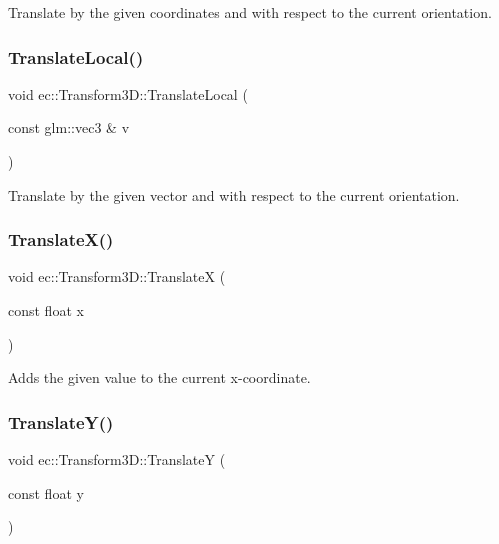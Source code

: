 Translate by the given coordinates and with respect to the current orientation. \mbox{\label{classec_1_1_transform3_d_a44ece37c7f56329840c2f92ae695e9a2}} 
\subsubsection{\texorpdfstring{Translate\+Local()}{TranslateLocal()}\hspace{0.1cm}{\footnotesize\ttfamily [2/2]}}
{\footnotesize\ttfamily void ec\+::\+Transform3\+D\+::\+Translate\+Local (\begin{DoxyParamCaption}\item[{const glm\+::vec3 \&}]{v }\end{DoxyParamCaption})}

Translate by the given vector and with respect to the current orientation. \mbox{\label{classec_1_1_transform3_d_a0c1e55c9edcd7cb53199fd05ba111099}} 
\subsubsection{\texorpdfstring{Translate\+X()}{TranslateX()}}
{\footnotesize\ttfamily void ec\+::\+Transform3\+D\+::\+TranslateX (\begin{DoxyParamCaption}\item[{const float}]{x }\end{DoxyParamCaption})}

Adds the given value to the current x-\/coordinate. \mbox{\label{classec_1_1_transform3_d_ae95b02e45148ca35e98ae54d23b01904}} 
\subsubsection{\texorpdfstring{Translate\+Y()}{TranslateY()}}
{\footnotesize\ttfamily void ec\+::\+Transform3\+D\+::\+TranslateY (\begin{DoxyParamCaption}\item[{const float}]{y }\end{DoxyParamCaption})}

